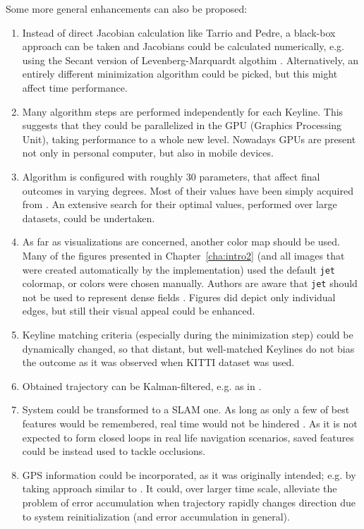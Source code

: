 Some more general enhancements can also be proposed:
\begin{enumerate}
	\item Instead of direct Jacobian calculation like Tarrio and Pedre, a black-box approach can be taken and Jacobians could be calculated numerically, e.g. using the Secant version of Levenberg-Marquardt algothim \cite{madsen2004methods}. Alternatively, an entirely different minimization algorithm could be picked, but this might affect time performance.
	\item Many algorithm steps are performed independently for each Keyline. This suggests that they could be parallelized in the GPU (Graphics Processing Unit), taking performance to a whole new level. Nowadays GPUs are present not only in personal computer, but also in mobile devices.
	\item Algorithm is configured with roughly 30 parameters, that affect final outcomes in varying degrees. Most of their values have been simply acquired from \cite{jose2015realtime}. An extensive search for their optimal values, performed over large datasets, could be undertaken.
	\item As far as visualizations are concerned, another color map should be used. Many of the figures presented in Chapter~\ref{cha:intro2} (and all images that were created automatically by the implementation) used the default \texttt{jet} colormap, or colors were chosen manually. Authors are aware that \texttt{jet} should not be used to represent dense fields \cite{rainbow}. Figures did depict only individual edges, but still their visual appeal could be enhanced.
	\item Keyline matching criteria (especially during the minimization step) could be dynamically changed, so that distant, but well-matched Keylines do not bias the outcome as it was observed when KITTI \cite{kitti} dataset was used.
	\item Obtained trajectory can be Kalman-filtered, e.g. as in \cite{min2015visual}.
	\item System could be transformed to a SLAM one. As long as only a few of best features would be remembered, real time would not be hindered \cite{monoslam}. As it is not expected to form closed loops in real life navigation scenarios, saved features could be instead used to tackle occlusions.
	\item GPS information could be incorporated, as it was originally intended; e.g. by taking approach similar to \cite{accurate_global_localization}. It could, over larger time scale, alleviate the problem of error accumulation when trajectory rapidly changes direction due to system reinitialization (and error accumulation in general).
\end{enumerate}


